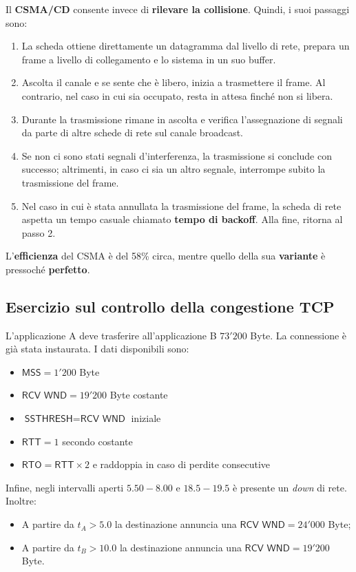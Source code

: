 \documentclass[a4paper]{article}
\begin{document}
	\noindent
	Il \textcolor{Red3}{\textbf{CSMA/CD}} consente invece di \textbf{rilevare la collisione}. Quindi, i suoi passaggi sono:
	\begin{enumerate}
		\item La scheda ottiene direttamente un datagramma dal livello di rete, prepara un frame a livello di collegamento e lo sistema in un suo buffer.

		\item Ascolta il canale e se sente che è libero, inizia a trasmettere il frame. Al contrario, nel caso in cui sia occupato, resta in attesa finché non si libera.
		
		\item Durante la trasmissione rimane in ascolta e verifica l’assegnazione di segnali da parte di altre schede di rete sul canale broadcast.
		
		\item Se non ci sono stati segnali d’interferenza, la trasmissione si conclude con successo; altrimenti, in caso ci sia un altro segnale, interrompe subito la trasmissione del frame.
		
		\item Nel caso in cui è stata annullata la trasmissione del frame, la scheda di rete aspetta un tempo casuale chiamato \textbf{tempo di backoff}. Alla fine, ritorna al passo 2.
	\end{enumerate}
	L'\textbf{efficienza} del CSMA è del 58\% circa, mentre quello della sua \textbf{variante} è pressoché \textbf{perfetto}.\newpage
	
	\subsection{\textcolor{Red3}{Esercizio sul controllo della congestione TCP}}
	
	L’applicazione A deve trasferire all'applicazione B $73'200$ Byte. La connessione è già stata instaurata. I dati disponibili sono:
	\begin{itemize}
		\item $\textsf{MSS} = 1'200$ Byte
		\item $\textsf{RCV WND} = 19'200$ Byte costante
		\item $\textsf{SSTHRESH} = \textsf{RCV WND}$ iniziale
		\item $\textsf{RTT} = 1$ secondo costante
		\item $\textsf{RTO} = \textsf{RTT} \times 2$ e raddoppia in caso di perdite consecutive
	\end{itemize}
	Infine, negli intervalli aperti $5.50 - 8.00$ e $18.5 - 19.5$ è presente un \emph{down} di rete. Inoltre:
	\begin{itemize}
		\item A partire da $t_{A} > 5.0$ la destinazione annuncia una $\textsf{RCV WND} = 24'000$ Byte;
		\item A partire da $t_{B} > 10.0$ la destinazione annuncia una $\textsf{RCV WND} = 19'200$ Byte.
	\end{itemize}
	
\end{document}
